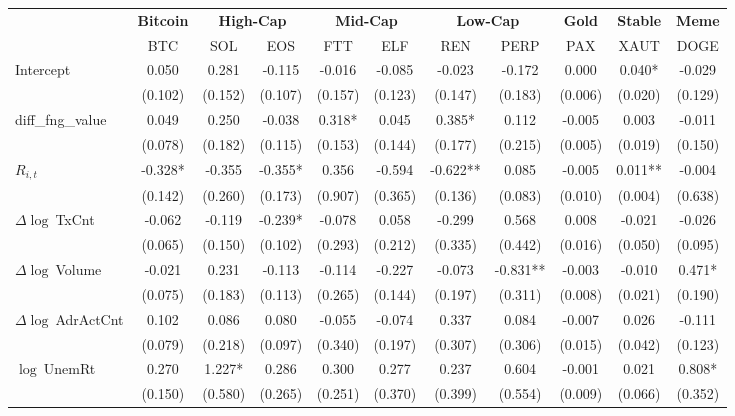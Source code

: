 \begin{table}[ht]
\centering
\scriptsize
\setlength{\tabcolsep}{4pt}
\begin{tabular}{l *{10}{c}}
\toprule
&\multicolumn{1}{c}{\textbf{Bitcoin}}&\multicolumn{2}{c}{\textbf{High-Cap}}&\multicolumn{2}{c}{\textbf{Mid-Cap}}&\multicolumn{2}{c}{\textbf{Low-Cap}}&\multicolumn{1}{c}{\textbf{Gold}}&\multicolumn{1}{c}{\textbf{Stable}}&\multicolumn{1}{c}{\textbf{Meme}}\\
\addlinespace
 & BTC & SOL & EOS & FTT & ELF & REN & PERP & PAX & XAUT & DOGE \\
\midrule
Intercept & 0.050 & 0.281 & -0.115 & -0.016 & -0.085 & -0.023 & -0.172 & 0.000 & 0.040* & -0.029 \\
 & (0.102) & (0.152) & (0.107) & (0.157) & (0.123) & (0.147) & (0.183) & (0.006) & (0.020) & (0.129) \\
\addlinespace
diff_fng_value & 0.049 & 0.250 & -0.038 & 0.318* & 0.045 & 0.385* & 0.112 & -0.005 & 0.003 & -0.011 \\
 & (0.078) & (0.182) & (0.115) & (0.153) & (0.144) & (0.177) & (0.215) & (0.005) & (0.019) & (0.150) \\
\addlinespace
$R_{i,t}$ & -0.328* & -0.355 & -0.355* & 0.356 & -0.594 & -0.622** & 0.085 & -0.005 & 0.011** & -0.004 \\
 & (0.142) & (0.260) & (0.173) & (0.907) & (0.365) & (0.136) & (0.083) & (0.010) & (0.004) & (0.638) \\
\addlinespace
$\Delta\log\ $TxCnt & -0.062 & -0.119 & -0.239* & -0.078 & 0.058 & -0.299 & 0.568 & 0.008 & -0.021 & -0.026 \\
 & (0.065) & (0.150) & (0.102) & (0.293) & (0.212) & (0.335) & (0.442) & (0.016) & (0.050) & (0.095) \\
\addlinespace
$\Delta\log\ $Volume & -0.021 & 0.231 & -0.113 & -0.114 & -0.227 & -0.073 & -0.831** & -0.003 & -0.010 & 0.471* \\
 & (0.075) & (0.183) & (0.113) & (0.265) & (0.144) & (0.197) & (0.311) & (0.008) & (0.021) & (0.190) \\
\addlinespace
$\Delta\log\ $AdrActCnt & 0.102 & 0.086 & 0.080 & -0.055 & -0.074 & 0.337 & 0.084 & -0.007 & 0.026 & -0.111 \\
 & (0.079) & (0.218) & (0.097) & (0.340) & (0.197) & (0.307) & (0.306) & (0.015) & (0.042) & (0.123) \\
\addlinespace
$\log\ $UnemRt & 0.270 & 1.227* & 0.286 & 0.300 & 0.277 & 0.237 & 0.604 & -0.001 & 0.021 & 0.808* \\
 & (0.150) & (0.580) & (0.265) & (0.251) & (0.370) & (0.399) & (0.554) & (0.009) & (0.066) & (0.352) \\

\end{tabular}
\end{table}
